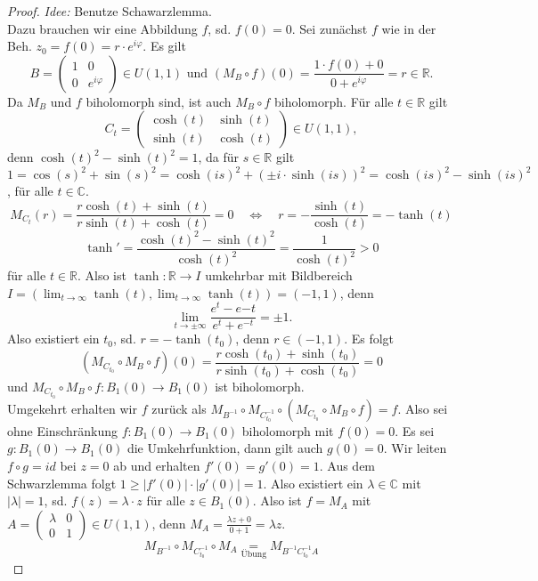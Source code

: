 \documentclass[11pt,titlepage]{article}
\theoremstyle{definition}
\theoremstyle{remark}
\begin{document}
	\begin{proof}
		\textsl{Idee:} Benutze Schawarzlemma. \\
		Dazu brauchen wir eine Abbildung $f$, sd. $f(0)=0$. Sei zunächst $f$ wie in der Beh. 
		$z_0 =f(0)=r\cdot e^{i\varphi}$. Es gilt
		\[ B=\begin{pmatrix}1&0\\0&e^{i\varphi}\end{pmatrix}\in U(1,1) \text{   und   } 
		(M_B \circ f)(0)=\frac{1\cdot f(0)+0}{0+e^{i\varphi}}=r\in\mathbb{R}. \]
		Da $M_B$ und $f$ biholomorph sind, ist auch $M_B \circ f$ biholomorph. Für alle 
		$t\in\mathbb{R}$ gilt 
		\[C_t =\begin{pmatrix}\cosh(t)&\sinh(t)\\ \sinh(t)&\cosh(t)\end{pmatrix}\in U(1,1),\]
		denn $\cosh(t)^2 -\sinh(t)^2 =1$, da für $s\in\mathbb{R}$ gilt 
		$1=\cos(s)^2+\sin(s)^2=\cosh(is)^2+(\pm i\cdot \sinh(is))^2 =\cosh(is)^2-\sinh(is)^2$, für alle 
		$t\in\mathbb{C}$.
		\[ M_{C_t}(r)=\frac{r \cosh(t)+\sinh(t)}{r\sinh(t)+\cosh(t)}=0 \quad\Leftrightarrow\quad 
		r=-\frac{\sinh(t)}{\cosh(t)}=-\tanh(t) \]
		\[\tanh' =\frac{\cosh(t)^2 -\sinh(t)^2}{\cosh(t)^2}=\frac{1}{\cosh(t)^2}>0 \]
		für alle $t\in\mathbb{R}$. Also ist $\tanh :\mathbb{R}\to I$ umkehrbar mit Bildbereich 
		$I=(\lim_{t\to\infty}\tanh(t) ,\lim_{t\to\infty} \tanh(t))=(-1,1)$, denn 
		\[ \lim_{t\to \pm \infty} \frac{e^t -e{-t}}{e^t +e^{-t}}=\pm 1. \]
		Also existiert ein $t_0$, sd. $r=-\tanh(t_0)$, denn $r\in (-1,1)$. Es folgt
		\[(M_{C_{t_0}}\circ M_B \circ f)(0)=\frac{r\cosh(t_0)+\sinh(t_0)}{r\sinh(t_0)+\cosh(t_0)}=0 \]
		und $M_{C_{t_0}}\circ M_B\circ f:B_1(0)\to B_1(0)$ ist biholomorph. \\
		Umgekehrt erhalten wir $f$ zurück als $M_{B^{-1}}\circ M_{C_{t_0}^{-1}}\circ 
		(M_{C_{t_0}}\circ M_B \circ f)=f$. Also sei ohne Einschränkung $f:B_1(0)\to B_1(0)$ 
		biholomorph mit $f(0)=0$. Es sei $g:B_1(0)\to B_1(0)$ die Umkehrfunktion, dann gilt auch 
		$g(0)=0$. Wir leiten $f\circ g=id$ bei $z=0$ ab und erhalten $f'(0)=g'(0)=1$. 
		Aus dem Schwarzlemma folgt $1\geq |f'(0)|\cdot |g'(0)|=1$. Also existiert ein $\lambda\in 
		\mathbb{C}$ mit $|\lambda|=1$, sd. $f(z)=\lambda \cdot z$ für alle $z\in B_1(0)$. 
		Also ist $f=M_A$ mit $A=\left( \begin{smallmatrix}\lambda&0\\0&1\end{smallmatrix}\right) 
		\in U(1,1)$, denn $M_A =\frac{\lambda z+0}{0+1}=\lambda z$.
		\[M_{B^{-1}}\circ M_{C_{t_0}^{-1}}\circ M_A \underset{\text{Übung}}{=} M_{B^{-1}C_{t_0}^{-1}A}\]

\end{proof}
\end{document}
